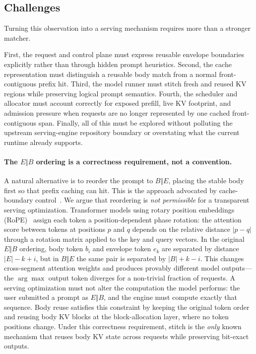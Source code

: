\documentclass[conference]{IEEEtran}
\begin{document}
\subsection{Challenges}

Turning this observation into a serving mechanism requires more than a stronger matcher.

First, the request and control plane must express reusable envelope boundaries explicitly rather than through hidden prompt heuristics. Second, the cache representation must distinguish a reusable body match from a normal front-contiguous prefix hit. Third, the model runner must stitch fresh and reused KV regions while preserving logical prompt semantics. Fourth, the scheduler and allocator must account correctly for exposed prefill, live KV footprint, and admission pressure when requests are no longer represented by one cached front-contiguous span. Finally, all of this must be explored without polluting the upstream serving-engine repository boundary or overstating what the current runtime already supports.

\paragraph{The $E \Vert B$ ordering is a correctness requirement, not a convention.}
A natural alternative is to reorder the prompt to $B \Vert E$, placing the stable body first so that prefix caching can hit. This is the approach advocated by cache-boundary control~\cite{lumer2026dontbreak}. We argue that reordering is \emph{not permissible} for a transparent serving optimization. Transformer models using rotary position embeddings (RoPE)~\cite{su2021roformer} assign each token a position-dependent phase rotation: the attention score between tokens at positions $p$ and $q$ depends on the relative distance $|p - q|$ through a rotation matrix applied to the key and query vectors. In the original $E \Vert B$ ordering, body token $b_i$ and envelope token $e_k$ are separated by distance $|E| - k + i$, but in $B \Vert E$ the same pair is separated by $|B| + k - i$. This changes cross-segment attention weights and produces provably different model outputs---the $\arg\max$ output token diverges for a non-trivial fraction of requests. A serving optimization must not alter the computation the model performs: the user submitted a prompt as $E \Vert B$, and the engine must compute exactly that sequence. Body reuse satisfies this constraint by keeping the original token order and reusing body KV blocks at the block-allocation layer, where no token positions change. Under this correctness requirement, stitch is the \emph{only} known mechanism that reuses body KV state across requests while preserving bit-exact outputs.
\end{document}
